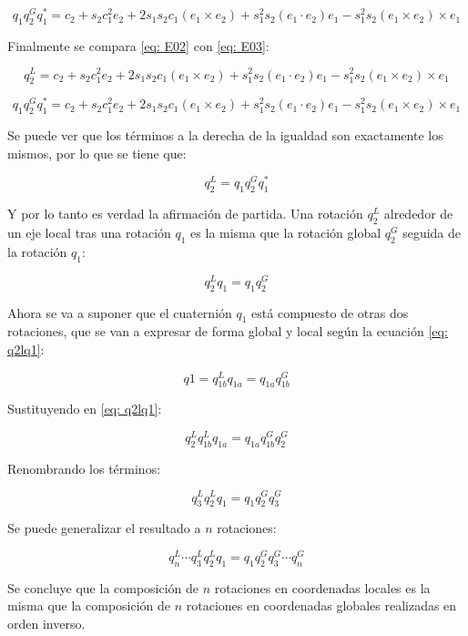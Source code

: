 \documentclass[10pt, a4paper]{report}
\begin{document}
\begin{equation} \label{eq: E03}
q_1q_2^Gq_1^* = c_2 + s_2c_1^2e_2 + 2s_1s_2c_1(e_1 \times e_2) + s_1^2s_2(e_1 \cdot e_2)e_1 - s_1^2s_2(e_1 \times e_2) \times e_1
\end{equation}

Finalmente se compara \eqref{eq: E02} con \eqref{eq: E03}:

$$ q_2^L = c_2 + s_2c_1^2e_2 + 2s_1s_2c_1(e_1 \times e_2) + s_1^2s_2(e_1 \cdot e_2)e_1 - s_1^2s_2(e_1 \times e_2) \times e_1 $$

$$ q_1q_2^Gq_1^* = c_2 + s_2c_1^2e_2 + 2s_1s_2c_1(e_1 \times e_2) + s_1^2s_2(e_1 \cdot e_2)e_1 - s_1^2s_2(e_1 \times e_2) \times e_1 $$

Se puede ver que los términos a la derecha de la igualdad son exactamente los mismos, por lo que se tiene que:

\begin{equation} \label{eq: q2I}
q_2^L = q_1q_2^Gq_1^*
\end{equation}

Y por lo tanto es verdad la afirmación de partida. Una rotación $q_2^L$ alrededor de un eje local tras una rotación $q_1$ es la misma que la rotación global $q_2^G$ seguida de la rotación $q_1$:

\begin{equation} \label{eq: q2lq1}
q_2^Lq_1 = q_1q_2^G
\end{equation}

Ahora se va a suponer que el cuaternión $q_1$ está compuesto de otras dos rotaciones, que se van a expresar de forma global y local según la ecuación \eqref{eq: q2lq1}:

$$ q1 = q_{1b}^Lq_{1a} = q_{1a}q_{1b}^G $$

Sustituyendo en \eqref{eq: q2lq1}:

$$ q_2^Lq_{1b}^Lq_{1a} = q_{1a}q_{1b}^Gq_2^G $$

Renombrando los términos:

$$ q_3^Lq_{2}^Lq_{1} = q_{1}q_{2}^Gq_3^G $$

Se puede generalizar el resultado a $n$ rotaciones:

\begin{equation}
q_n^L \dotsm q_3^Lq_{2}^Lq_{1} = q_{1}q_{2}^Gq_3^G \dotsm q_n^G
\end{equation}

Se concluye que la composición de $n$ rotaciones en coordenadas locales es la misma que la composición de $n$ rotaciones en coordenadas globales realizadas en orden inverso.
\end{document}

